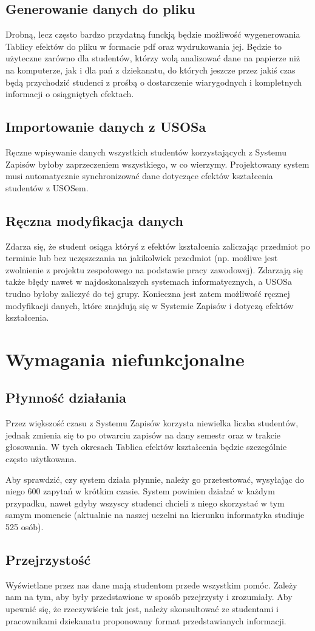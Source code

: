 \documentclass{article}
\begin{document}
\subsection{Generowanie danych do pliku}
Drobną, lecz często bardzo przydatną funckją będzie możliwość wygenerowania Tablicy efektów do pliku w formacie pdf oraz wydrukowania jej.
Będzie to użyteczne zarówno dla studentów, którzy wolą analizować dane na papierze niż na komputerze, jak i dla pań z dziekanatu, do których jeszcze przez jakiś czas będą przychodzić studenci z prośbą o dostarczenie wiarygodnych i kompletnych informacji o osiągniętych efektach.

\subsection{Importowanie danych z USOSa}
Ręczne wpisywanie danych wszystkich studentów korzystających z Systemu Zapisów byłoby zaprzeczeniem wszystkiego, w co wierzymy.
Projektowany system musi automatycznie synchronizować dane dotyczące efektów kształcenia studentów z USOSem.

\subsection{Ręczna modyfikacja danych}
Zdarza się, że student osiąga któryś z efektów kształcenia zaliczając przedmiot po terminie lub bez uczęszczania na jakikolwiek przedmiot (np. możliwe jest zwolnienie z projektu zespołowego na podstawie pracy zawodowej).
Zdarzają się także błędy nawet w najdoskonalszych systemach informatycznych, a USOSa trudno byłoby zaliczyć do tej grupy.
Konieczna jest zatem możliwość ręcznej modyfikacji danych, które znajdują się w Systemie Zapisów i dotyczą efektów kształcenia.


\section{Wymagania niefunkcjonalne}

\subsection{Płynność działania}
Przez większość czasu z Systemu Zapisów korzysta niewielka liczba studentów, jednak zmienia się to po otwarciu zapisów na dany semestr oraz w trakcie głosowania.
W tych okresach Tablica efektów kształcenia będzie szczególnie często użytkowana.

Aby sprawdzić, czy system działa płynnie, należy go przetestować, wysyłając do niego 600 zapytań w krótkim czasie.
System powinien działać w każdym przypadku, nawet gdyby wszyscy studenci chcieli z niego skorzystać w tym samym momencie (aktualnie na naszej uczelni na kierunku informatyka studiuje 525 osób).

\subsection{Przejrzystość}
Wyświetlane przez nas dane mają studentom przede wszystkim pomóc.
Zależy nam na tym, aby były przedstawione w sposób przejrzysty i zrozumiały.
Aby upewnić się, że rzeczywiście tak jest, należy skonsultować ze studentami i pracownikami dziekanatu proponowany format przedstawianych informacji.
\end{document}
